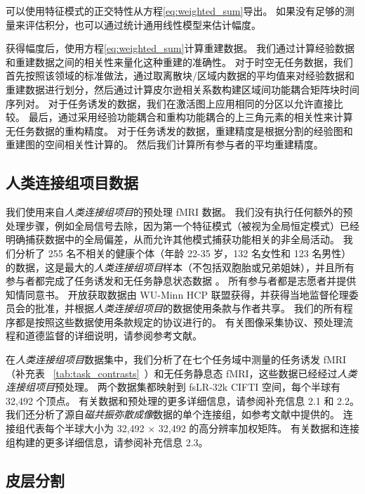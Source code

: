 \documentclass[lang=cn,a4paper,newtx,citestyle=gb7714-2015, bibstyle=gb7714-2015]{elegantpaper}
\begin{document}
可以使用特征模式的正交特性从方程\ref{eq:weighted_sum}导出\cite{robinson2021determination,courant2008methods}。
如果没有足够的测量来评估积分，也可以通过统计通用线性模型来估计幅度。


获得幅度后，使用方程\ref{eq:weighted_sum}计算重建数据。
我们通过计算经验数据和重建数据之间的相关性来量化这种重建的准确性。
对于时空无任务数据，我们首先按照该领域的标准做法，通过取离散块/区域内数据的平均值来对经验数据和重建数据进行划分\cite{eickhoff2018imaging}，然后通过计算皮尔逊相关系数构建区域间功能耦合矩阵块时间序列对。
对于任务诱发的数据，我们在激活图上应用相同的分区以允许直接比较。
最后，通过采用经验功能耦合和重构功能耦合的上三角元素的相关性来计算无任务数据的重构精度。
对于任务诱发的数据，重建精度是根据分割的经验图和重建图的空间相关性计算的。
然后我们计算所有参与者的平均重建精度。



\subsection{人类连接组项目数据} \label{sec:HCP_data}

我们使用来自\textit{人类连接组项目}\cite{van2013wu}的预处理 fMRI 数据。
我们没有执行任何额外的预处理步骤，例如全局信号去除，因为第一个特征模式（被视为全局恒定模式）已经明确捕获数据中的全局偏差，从而允许其他模式捕获功能相关的非全局活动。
我们分析了 255 名不相关的健康个体（年龄 22-35 岁，132 名女性和 123 名男性）的数据，这是最大的\textit{人类连接组项目}样本（不包括双胞胎或兄弟姐妹），并且所有参与者都完成了任务诱发和无任务静息状态数据 。
所有参与者都是志愿者并提供知情同意书。 开放获取数据由 WU-Minn HCP 联盟获得，并获得当地监督伦理委员会的批准，并根据\textit{人类连接组项目}的数据使用条款与作者共享。
我们的所有程序都是按照这些数据使用条款规定的协议进行的。 有关图像采集协议、预处理流程和道德监督的详细说明，请参阅参考文献\cite{van2013wu,barch2013function}。


在\textit{人类连接组项目}数据集中，我们分析了在七个任务域中测量的任务诱发 fMRI（补充表 ~\ref{tab:task_contrasts}~）和无任务静息态 fMRI，这些数据已经经过\textit{人类连接组项目}预处理。
两个数据集都映射到 fsLR-32k CIFTI 空间，每个半球有 32,492 个顶点。
有关数据和预处理的更多详细信息，请参阅补充信息 2.1 和 2.2。
我们还分析了源自\textit{磁共振弥散成像}数据的单个连接组，如参考文献中提供的\cite{tian2021high}。
连接组代表每个半球大小为 32,492 × 32,492 的高分辨率加权矩阵。
有关数据和连接组构建的更多详细信息，请参阅补充信息 2.3。


\subsection{皮层分割} \label{sec:cortical_parcellations}
\end{document}
